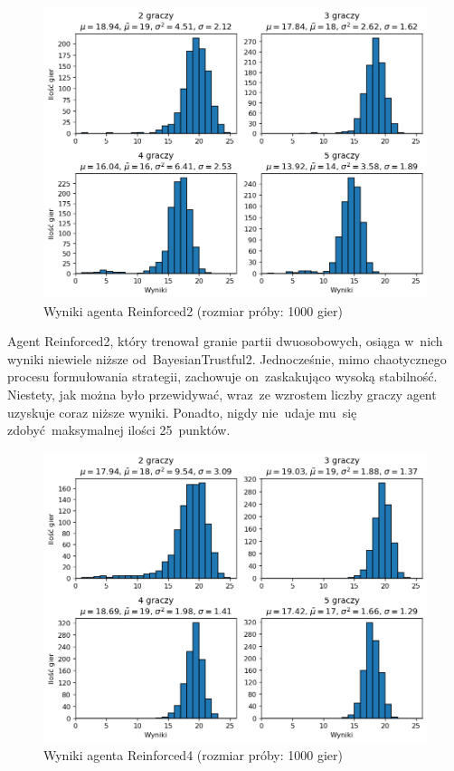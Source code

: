 \documentclass[declaration,shortabstract,inz]{iithesis}
\begin{document}
\begin{figure}[H]
	\centering
	\captionsetup{format=hang}
	\includegraphics[width=\textwidth,height=\textheight,keepaspectratio]{Reinforced2.png}
	\caption[Caption]{Wyniki agenta Reinforced2 (rozmiar próby: 1000 gier)}
	\label{fig:Reinforced2}
\end{figure}

Agent Reinforced2, który trenował granie partii dwuosobowych, osiąga w~nich wyniki niewiele niższe od~BayesianTrustful2. Jednocześnie, mimo chaotycznego procesu formułowania strategii, zachowuje on~zaskakująco wysoką stabilność. Niestety, jak można było przewidywać, wraz~ze wzrostem liczby graczy agent uzyskuje coraz niższe wyniki. Ponadto, nigdy nie~udaje mu~się zdobyć maksymalnej ilości 25~punktów.

\bigskip

\begin{figure}[H]
	\centering
	\captionsetup{format=hang}
	\includegraphics[width=\textwidth,height=\textheight,keepaspectratio]{Reinforced4.png}
	\caption[Caption]{Wyniki agenta Reinforced4 (rozmiar próby: 1000 gier)}
	\label{fig:Reinforced4}
\end{figure}
\end{document}
